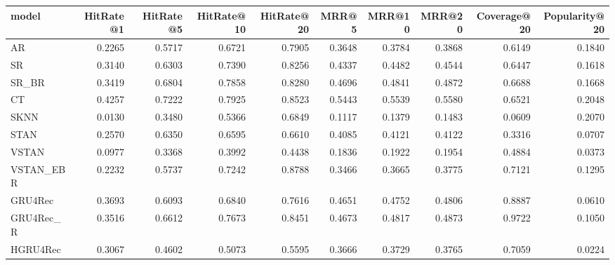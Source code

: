 \begin{tabular}{lrrrrrrrrr}
\toprule
     model &  HitRate@1 &  HitRate@5 &  HitRate@10 &  HitRate@20 &   MRR@5 &  MRR@10 &  MRR@20 &  Coverage@20 &  Popularity@20 \\
\midrule
        AR &     0.2265 &     0.5717 &      0.6721 &      0.7905 &  0.3648 &  0.3784 &  0.3868 &       0.6149 &         0.1840 \\
        SR &     0.3140 &     0.6303 &      0.7390 &      0.8256 &  0.4337 &  0.4482 &  0.4544 &       0.6447 &         0.1618 \\
     SR\_BR &     0.3419 &     0.6804 &      0.7858 &      0.8280 &  0.4696 &  0.4841 &  0.4872 &       0.6688 &         0.1668 \\
        CT &     0.4257 &     0.7222 &      0.7925 &      0.8523 &  0.5443 &  0.5539 &  0.5580 &       0.6521 &         0.2048 \\
      SKNN &     0.0130 &     0.3480 &      0.5366 &      0.6849 &  0.1117 &  0.1379 &  0.1483 &       0.0609 &         0.2070 \\
      STAN &     0.2570 &     0.6350 &      0.6595 &      0.6610 &  0.4085 &  0.4121 &  0.4122 &       0.3316 &         0.0707 \\
     VSTAN &     0.0977 &     0.3368 &      0.3992 &      0.4438 &  0.1836 &  0.1922 &  0.1954 &       0.4884 &         0.0373 \\
 VSTAN\_EBR &     0.2232 &     0.5737 &      0.7242 &      0.8788 &  0.3466 &  0.3665 &  0.3775 &       0.7121 &         0.1295 \\
   GRU4Rec &     0.3693 &     0.6093 &      0.6840 &      0.7616 &  0.4651 &  0.4752 &  0.4806 &       0.8887 &         0.0610 \\
 GRU4Rec\_R &     0.3516 &     0.6612 &      0.7673 &      0.8451 &  0.4673 &  0.4817 &  0.4873 &       0.9722 &         0.1050 \\
  HGRU4Rec &     0.3067 &     0.4602 &      0.5073 &      0.5595 &  0.3666 &  0.3729 &  0.3765 &       0.7059 &         0.0224 \\
\bottomrule
\end{tabular}
